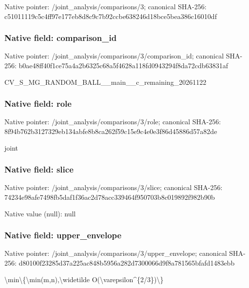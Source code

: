 \documentclass[10pt,a4paper]{article}
\begin{document}
Native pointer: /joint\_analysis/comparisons/3; canonical SHA-256: c51011119c5c4ff97e177eb8\allowbreak{}d8c9c7b92ccbe638246d18bc\allowbreak{}e5bea386c16010df



\subsubsection{Native field: comparison\_id}


Native pointer: /joint\_analysis/comparis\allowbreak{}ons/3/comparison\_id; canonical SHA-256: b0ae48ff40f1ce75a4a2b632\allowbreak{}5c68a5f4628a118fd0943294\allowbreak{}f8da72cdb63831af


CV\_S\_MG\_RANDOM\_BALL\_\_mai\allowbreak{}n\_\_c\_remaining\_20261122


\subsubsection{Native field: role}


Native pointer: /joint\_analysis/comparisons/3/role; canonical SHA-256: 8f94b762b3127329eb134abf\allowbreak{}e8b8ca262f59c15e9c4e0e3f\allowbreak{}86d45886d57a82de


joint


\subsubsection{Native field: slice}


Native pointer: /joint\_analysis/comparisons/3/slice; canonical SHA-256: 74234e98afe7498fb5daf1f3\allowbreak{}6ac2d78acc339464f950703b\allowbreak{}8c019892f982b90b



Native value (null): null



\subsubsection{Native field: upper\_envelope}


Native pointer: /joint\_analysis/comparis\allowbreak{}ons/3/upper\_envelope; canonical SHA-256: d80100f23285d37a225ac848\allowbreak{}b5956a282d7300066d9f8a78\allowbreak{}1565bfafd1483ebb


\textbackslash{}min\textbackslash{}\{\textbackslash{}min(m,n),\textbackslash{}widetilde O(\textbackslash{}varepsilon\textasciicircum{}\{2/3\})\textbackslash{}\}
\end{document}

